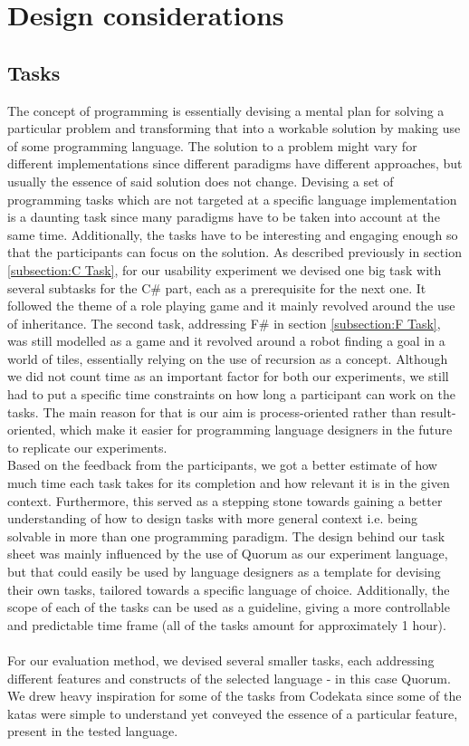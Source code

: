 
\chapter{Design considerations}

\section{Tasks}
The concept of programming is essentially devising a mental plan for solving a particular problem and transforming that into a workable solution by making use of some programming language. The solution to a problem might vary for different implementations since different paradigms have different approaches, but usually the essence of said solution does not change. Devising a set of programming tasks which are not targeted at a specific language implementation is a daunting task since many paradigms have to be taken into account at the same time. Additionally, the tasks have to be interesting and engaging enough so that the participants can focus on the solution. As described previously in section \ref{subsection:C Task}, for our usability experiment we devised one big task with several subtasks for the C\# part, each as a prerequisite for the next one. It followed the theme of a role playing game and it mainly revolved around the use of inheritance. The second task, addressing F\# in section \ref{subsection:F Task}, was still modelled as a game and it revolved around a robot finding a goal in a world of tiles, essentially relying on the use of recursion as a concept. Although we did not count time as an important factor for both our experiments, we still had to put a specific time constraints on how long a participant can work on the tasks. The main reason for that is our aim is process-oriented rather than result-oriented, which make it easier for programming language designers in the future to replicate our experiments.\\ Based on the feedback from the participants, we got a better estimate of how much time each task takes for its completion and how relevant it is in the given context. Furthermore, this served as a stepping stone towards gaining a better understanding of how to design tasks with more general context i.e. being solvable in more than one programming paradigm. The design behind our task sheet was mainly influenced by the use of Quorum as our experiment language, but that could easily be used by language designers as a template for devising their own tasks, tailored towards a specific language of choice. Additionally, the scope of each of the tasks  can be used as a guideline, giving a more controllable and predictable time frame (all of the tasks amount for approximately 1 hour). 
\\\\For our evaluation method, we devised several smaller tasks, each addressing different features and constructs of the selected language - in this case Quorum. We drew heavy inspiration for some of the tasks from Codekata \cite{Codekata} since some of the katas were simple to understand yet conveyed the essence of a particular feature, present in the tested language.
